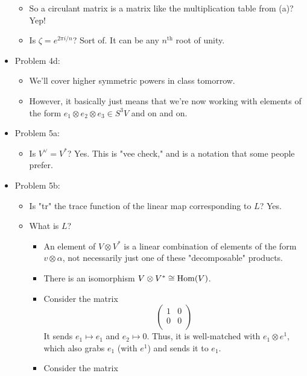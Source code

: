 \documentclass[../notes.tex]{subfiles}
\begin{document}
\begin{itemize}
\begin{itemize}
        \item So a circulant matrix is a matrix like the multiplication table from (a)? Yep!
        \item Is $\zeta=e^{2\pi i/n}$? Sort of. It can be any $n^\text{th}$ root of unity.
    \end{itemize}
    \item Problem 4d:
    \begin{itemize}
        \item We'll cover higher symmetric powers in class tomorrow.
        \item However, it basically just means that we're now working with elements of the form $e_1\otimes e_2\otimes e_3\in S^3V$ and on and on.
    \end{itemize}
    \item Problem 5a:
    \begin{itemize}
        \item Is $V^\vee=V^*$? Yes. This is "vee check," and is a notation that some people prefer.
    \end{itemize}
    \item Problem 5b:
    \begin{itemize}
        \item Is "tr" the trace function of the linear map corresponding to $L$? Yes.
        \item What is $L$?
        \begin{itemize}
            \item An element of $V\otimes V^*$ is a linear combination of elements of the form $v\otimes\alpha$, not necessarily just one of these "decomposable" products.
            \item There is an isomorphism $V\otimes V^*\cong\operatorname{Hom}(V)$.
            \item Consider the matrix
            \begin{equation*}
                \begin{pmatrix}
                    1 & 0\\
                    0 & 0\\
                \end{pmatrix}
            \end{equation*}
            It sends $e_1\mapsto e_1$ and $e_2\mapsto 0$. Thus, it is well-matched with $e_1\otimes e^1$, which also grabs $e_1$ (with $e^1$) and sends it to $e_1$.
            \item Consider the matrix
            \begin{equation*}

\end{equation*}
\end{itemize}
\end{itemize}
\end{itemize}
\end{document}
